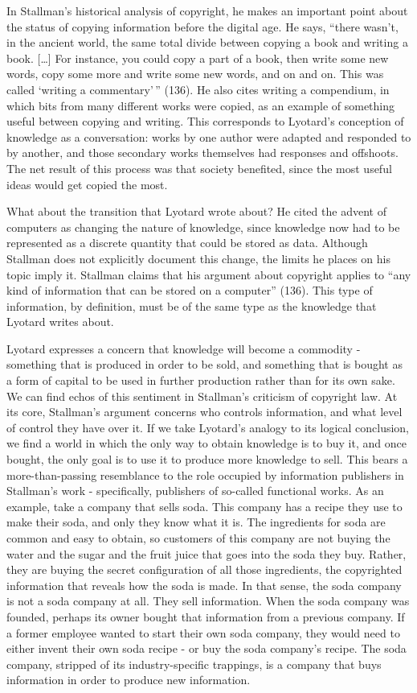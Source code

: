 \documentclass[titlepage]{article}
\begin{document}
In Stallman's historical analysis of copyright, he makes an important
point about the status of copying information before the digital age. He
says, ``there wasn't, in the ancient world, the same total divide
between copying a book and writing a book. {[}\ldots{}{]} For instance,
you could copy a part of a book, then write some new words, copy some
more and write some new words, and on and on. This was called `writing a
commentary'\,'' (136). He also cites writing a compendium, in which bits
from many different works were copied, as an example of something useful
between copying and writing. This corresponds to Lyotard's conception of
knowledge as a conversation: works by one author were adapted and
responded to by another, and those secondary works themselves had
responses and offshoots. The net result of this process was that society
benefited, since the most useful ideas would get copied the most.

What about the transition that Lyotard wrote about? He cited the advent
of computers as changing the nature of knowledge, since knowledge now
had to be represented as a discrete quantity that could be stored as
data. Although Stallman does not explicitly document this change, the
limits he places on his topic imply it. Stallman claims that his
argument about copyright applies to ``any kind of information that can
be stored on a computer'' (136). This type of information, by
definition, must be of the same type as the knowledge that Lyotard
writes about.

Lyotard expresses a concern that knowledge will become a commodity -
something that is produced in order to be sold, and something that is
bought as a form of capital to be used in further production rather than
for its own sake. We can find echos of this sentiment in Stallman's
criticism of copyright law. At its core, Stallman's argument concerns
who controls information, and what level of control they have over it.
If we take Lyotard's analogy to its logical conclusion, we find a world
in which the only way to obtain knowledge is to buy it, and once bought,
the only goal is to use it to produce more knowledge to sell. This bears
a more-than-passing resemblance to the role occupied by information
publishers in Stallman's work - specifically, publishers of so-called
functional works. As an example, take a company that sells soda. This
company has a recipe they use to make their soda, and only they know
what it is. The ingredients for soda are common and easy to obtain, so
customers of this company are not buying the water and the sugar and the
fruit juice that goes into the soda they buy. Rather, they are buying
the secret configuration of all those ingredients, the copyrighted
information that reveals how the soda is made. In that sense, the soda
company is not a soda company at all. They sell information. When the
soda company was founded, perhaps its owner bought that information from
a previous company. If a former employee wanted to start their own soda
company, they would need to either invent their own soda recipe - or buy
the soda company's recipe. The soda company, stripped of its
industry-specific trappings, is a company that buys information in order
to produce new information.
\end{document}
